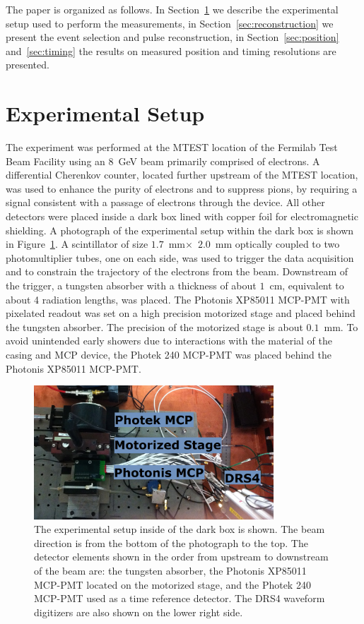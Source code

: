 \documentclass[12pt]{article}
\begin{document}
The paper is organized as follows. In Section~\ref{sec:setup} we describe the
experimental setup used to perform the measurements, in
Section~\ref{sec:reconstruction} we present the event selection and pulse
reconstruction, in Section~\ref{sec:position} and~\ref{sec:timing} the results
on measured position and timing resolutions are presented. 

\section{Experimental Setup} \label{sec:setup} The experiment was performed at
the MTEST location of the Fermilab Test Beam Facility using an $8$~GeV beam
primarily comprised of electrons. A differential Cherenkov counter, located
further upstream of the MTEST location, was used to enhance the purity of
electrons and to suppress pions, by requiring a signal consistent with a passage
of electrons through the device. All other detectors were placed inside a dark
box lined with copper foil for electromagnetic shielding. A photograph of the
experimental setup within the dark box is shown in Figure~\ref{fig:setup}. A
scintillator of size $1.7$~mm$\times$~$2.0$~mm optically coupled to two
photomultiplier tubes, one on each side, was used to trigger the data
acquisition and to constrain the trajectory of the electrons from the beam.
Downstream of the trigger, a tungsten absorber with a thickness of about $1$~cm,
equivalent to about 4 radiation lengths, was placed. The Photonis XP85011
MCP-PMT with pixelated readout was set on a high precision motorized stage and
placed behind the tungsten absorber. The precision of the motorized stage is
about $0.1$~mm. To avoid unintended early showers due to interactions with the
material of the casing and MCP device, the Photek 240 MCP-PMT was placed behind
the Photonis XP85011 MCP-PMT. 

\begin{figure}[htbp] 
\centering
\includegraphics[width=0.8\textwidth]{Images/setup/setup.png} 
\caption{The experimental setup inside of the dark box is shown. The beam direction is from
the bottom of the photograph to the top. The detector elements shown in the
order from upstream to downstream of the beam are: the tungsten absorber, the
Photonis XP85011 MCP-PMT located on the motorized stage, and the Photek 240
MCP-PMT used as a time reference detector. The DRS4 waveform digitizers are also
shown on the lower right side.} 
\label{fig:setup} 
\end{figure} 
\end{document}
